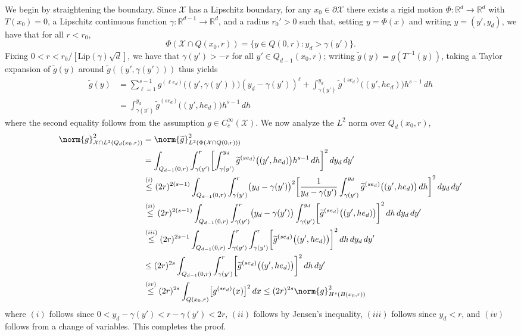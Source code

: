 \documentclass{article}
\newcommand{\Reals}{\mathbb{R}}
\newcommand{\1}{\mathbf{1}}
\newcommand{\Rd}{\Reals^d}
\newcommand{\Xset}{\mathcal{X}}
\newcommand{\Leb}{L}
\newcommand{\wt}[1]{\widetilde{#1}}
\theoremstyle{alden}
\theoremstyle{aldenthm}
\theoremstyle{definition}
\theoremstyle{remark}
\begin{document}
We begin by straightening the boundary. Since $\Xset$ has a Lipschitz boundary, for any $x_0 \in \partial \Xset$ there exists a rigid motion $\Phi: \Rd \to \Rd$ with $T(x_0) = 0$, a Lipschitz continuous function $\gamma: \Reals^{d-1} \to \Reals^d$, and a radius $r_0' > 0$ such that, setting $y = \Phi(x)$ and writing $y = (y',y_d)$, we have that for all $r < r_0$,
\begin{equation*}
\Phi(\Xset \cap Q(x_0,r)) = \bigl\{y \in Q(0,r): y_d > \gamma(y')\bigr\}.
\end{equation*}
Fixing $0 < r < r_0/[\mathrm{Lip}(\gamma)\sqrt{d}]$, we have that $\gamma(y') > -r$ for all $y' \in Q_{d - 1}(x_0,r)$; writing $\wt{g}(y) = g(T^{-1}(y))$, taking a Taylor expansion of $\wt{g}(y)$ around $\wt{g}((y',\gamma(y')))$ thus yields
\begin{align*}
\wt{g}(y) & = \sum_{\ell = 1}^{s - 1} g^{(\ell e_d)}\bigl((y',\gamma(y'))\bigr) (y_d - \gamma(y'))^{\ell} + \int_{\gamma(y')}^{y_d} \wt{g}^{(se_d)}\bigl((y',he_d)\bigr) h^{s - 1}\,dh \\
& = \int_{\gamma(y')}^{y_d} \wt{g}^{(se_d)}\bigl((y',he_d)\bigr) h^{s - 1}\,dh
\end{align*}
where the second equality follows from the assumption $g \in C_c^{\infty}(\Xset)$. We now analyze the $\Leb^2$ norm over $Q_d(x_0,r)$,
\begin{align*}
\norm{g}_{\Xset \cap \Leb^2(Q_d(x_0,r))}^2 & = \norm{\wt{g}}_{\Leb^2(\Phi(\Xset \cap Q(0,r)))}^2 \\
& = \int_{Q_{d - 1}(0,r)} \int_{\gamma(y')}^{r} \biggl[\int_{\gamma(y')}^{y_d} \wt{g}^{(se_d)}\bigl((y',he_d)\bigr)h^{s - 1} \,dh\biggr]^2 \,dy_d \,dy' \\
& \overset{(i)}{\leq} (2r)^{2(s - 1)} \int_{Q_{d - 1}(0,r)} \int_{\gamma(y')}^{r} \bigl(y_d - \gamma(y')\bigr)^2 \biggl[\frac{1}{y_d - \gamma(y')}\int_{\gamma(y')}^{y_d} \wt{g}^{(se_d)}\bigl((y',he_d)\bigr) \,dh\biggr]^2 \,dy_d \,dy' \\
& \overset{(ii)}{\leq}  (2r)^{2(s - 1)} \int_{Q_{d - 1}(0,r)} \int_{\gamma(y')}^{r} \bigl(y_d - \gamma(y')\bigr) \int_{\gamma(y')}^{y_d} \biggl[\wt{g}^{(se_d)}\bigl((y',he_d)\bigr)\biggr]^2 \,dh \,dy_d \,dy' \\
& \overset{(iii)}{\leq}  (2r)^{2s - 1} \int_{Q_{d - 1}(0,r)} \int_{\gamma(y')}^{r} \int_{\gamma(y')}^{r} \biggl[\wt{g}^{(se_d)}\bigl((y',he_d)\bigr)\biggr]^2 \,dh \,dy_d \,dy' \\
& \leq  (2r)^{2s} \int_{Q_{d - 1}(0,r)}  \int_{\gamma(y')}^{r} \biggl[\wt{g}^{(se_d)}\bigl((y',he_d)\bigr)\biggr]^2 \,dh  \,dy' \\
& \overset{(iv)}{\leq} (2r)^{2s} \int_{Q(x_0,r)} \bigl[g^{(se_d)}(x)\bigr]^2 \,dx \leq (2r)^{2s} \norm{g}_{H^s(B(x_0,r))}^2
\end{align*} 
where $(i)$ follows since $0 < y_d - \gamma(y') < r - \gamma(y') < 2r$, $(ii)$ follows by Jensen's inequality, $(iii)$ follows since $y_d < r$, and $(iv)$ follows from a change of variables. This completes the proof.
\end{document}
